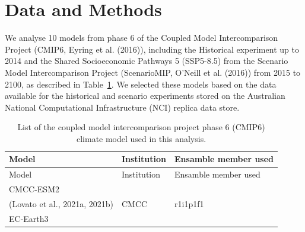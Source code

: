 \documentclass[
]{agujournal2019}
\begin{document}
\section{Data and Methods}\label{data-and-methods}

We analyse 10 models from phase 6 of the Coupled Model Intercomparison
Project (CMIP6, Eyring et al. (2016)), including the Historical
experiment up to 2014 and the Shared Socioeconomic Pathways 5 (SSP5-8.5)
from the Scenario Model Intercomparison Project (ScenarioMIP, O'Neill et
al. (2016)) from 2015 to 2100, as described in Table~\ref{tbl-models}.
We selected these models based on the data available for the historical
and scenario experiments stored on the Australian National Computational
Infrastructure (NCI) replica data store.

\begin{longtable}[]{@{}
  >{\raggedright\arraybackslash}p{}
  >{\raggedright\arraybackslash}p{}
  >{\raggedright\arraybackslash}p{}@{}}
\caption{List of the coupled model intercomparison project phase 6
(CMIP6) climate model used in this
analysis.}\label{tbl-models}\tabularnewline
\toprule\noalign{}
\begin{minipage}[b]{\linewidth}\raggedright
Model
\end{minipage} & \begin{minipage}[b]{\linewidth}\raggedright
Institution
\end{minipage} & \begin{minipage}[b]{\linewidth}\raggedright
Ensamble member used
\end{minipage} \\
\midrule\noalign{}
\endfirsthead
\toprule\noalign{}
\begin{minipage}[b]{\linewidth}\raggedright
Model
\end{minipage} & \begin{minipage}[b]{\linewidth}\raggedright
Institution
\end{minipage} & \begin{minipage}[b]{\linewidth}\raggedright
Ensamble member used
\end{minipage} \\
\midrule\noalign{}
\endhead
\bottomrule\noalign{}
\endlastfoot
CMCC-ESM2 & & \\
(Lovato et al., 2021a, 2021b) & CMCC & r1i1p1f1 \\
EC-Earth3 & & \\

\end{longtable}
\end{document}
